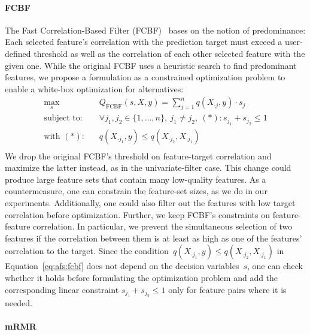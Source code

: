 \documentclass{article}
\theoremstyle{definition}
\begin{document}
\paragraph{FCBF}

The Fast Correlation-Based Filter (FCBF)~\cite{yu2003feature} bases on the notion of predominance:
Each selected feature's correlation with the prediction target must exceed a user-defined threshold as well as the correlation of each other selected feature with the given one.
While the original FCBF uses a heuristic search to find predominant features, we propose a formulation as a constrained optimization problem to enable a white-box optimization for alternatives:
%
\begin{equation}
	\begin{aligned}
		\max_s &\quad Q_{\text{FCBF}}(s,X,y) = \sum_{j=1}^{n} q(X_{\cdot{}j},y) \cdot s_j \\
		\text{subject to:} &\quad \forall j_1, j_2 \in \{1, \dots, n\},~j_1 \neq j_2,~(*): s_{j_1} + s_{j_2} \leq 1 \\
		\text{with } (*) \text{:} &\quad q(X_{\cdot{}j_1},y) \leq q(X_{\cdot{}j_2}, X_{\cdot{}j_1}) \\
	\end{aligned}
	\label{eq:afs:fcbf}
\end{equation}
%
We drop the original FCBF's threshold on feature-target correlation and maximize the latter instead, as in the univariate-filter case.
This change could produce large feature sets that contain many low-quality features.
As a countermeasure, one can constrain the feature-set sizes, as we do in our experiments.
Additionally, one could also filter out the features with low target correlation before optimization.
Further, we keep FCBF's constraints on feature-feature correlation.
In particular, we prevent the simultaneous selection of two features if the correlation between them is at least as high as one of the features' correlation to the target.
Since the condition~$q(X_{\cdot{}j_1},y) \leq q(X_{\cdot{}j_2}, X_{\cdot{}j_1})$ in Equation~\ref{eq:afs:fcbf} does not depend on the decision variables~$s$, one can check whether it holds before formulating the optimization problem and add the corresponding linear constraint $s_{j_1} + s_{j_2} \leq 1$ only for feature pairs where it is needed.

\paragraph{mRMR}
\end{document}
